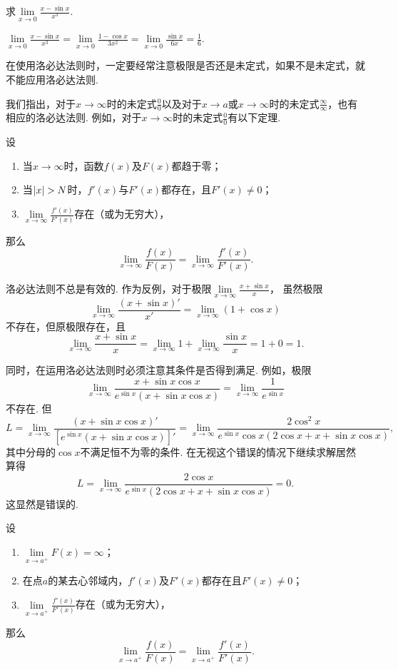 \begin{example}
\def\l{\lim\limits_{x\to0}}
\def\a{\l\frac{x-\sin x}{x^3}}
求\(\a\).
\begin{solution}
\(\a = \l\frac{1-\cos x}{3x^2} = \l\frac{\sin x}{6x} = \frac{1}{6}\).
\end{solution}
\end{example}

在使用洛必达法则时，一定要经常注意极限是否还是未定式，如果不是未定式，就不能应用洛必达法则.

我们指出，对于\(x\to\infty\)时的未定式\(\frac{0}{0}\)以及对于\(x \to a\)或\(x\to\infty\)时的未定式\(\frac{\infty}{\infty}\)，也有相应的洛必达法则.
例如，对于\(x\to\infty\)时的未定式\(\frac{0}{0}\)有以下定理.
\begin{theorem}\label{theorem:微分中值定理.洛必达法则2}
\def\l{\lim\limits_{x\to\infty}}
设\begin{enumerate}
	\item 当\(x\to\infty\)时，函数\(f(x)\)及\(F(x)\)都趋于零；
	\item 当\(\abs{x}>N\)时，\(f'(x)\)与\(F'(x)\)都存在，且\(F'(x) \neq 0\)；
	\item \(\l\frac{f'(x)}{F'(x)}\)存在（或为无穷大），%
\end{enumerate}那么\[
	\l\frac{f(x)}{F(x)} = \l\frac{f'(x)}{F'(x)}.
\]
\end{theorem}

\begin{example}
\def\l{\lim\limits_{x\to\infty}}%
\def\a{\l\frac{x+\sin x}{x}}%
洛必达法则不总是有效的.
作为反例，对于极限\(\a\)，%
虽然极限\[
\l\frac{(x+\sin x)'}{x'} = \l(1+\cos x)
\]不存在，但原极限存在，且
\[
\a = \l1+\l\frac{\sin x}{x} = 1 + 0 = 1.
\]

\def\l{\lim\limits_{x\to\infty}}%
\def\a{\l\frac{x+\sin x \cos x}{e^{\sin x}(x+\sin x \cos x)}}%
同时，在运用洛必达法则时必须注意其条件是否得到满足.
例如，极限\[
\a = \l\frac{1}{e^{\sin x}}
\]不存在.
但\[
L = \l\frac{(x+\sin x \cos x)'}{[e^{\sin x}(x+\sin x \cos x)]'} = \l\frac{2\cos^2 x}{e^{\sin x}\cos x(2\cos x + x + \sin x \cos x)},
\]其中分母的\(\cos x\)不满足恒不为零的条件.
在无视这个错误的情况下继续求解居然算得
\[
L = \l\frac{2\cos x}{e^{\sin x}(2\cos x + x + \sin x \cos x)} = 0.
\]
这显然是错误的.
\end{example}

\begin{theorem}\label{theorem:微分中值定理.洛必达法则3}
\def\l{\lim\limits_{x \to a^+}}
设\begin{enumerate}
\item \(\l F(x) = \infty\)；
\item 在点\(a\)的某去心邻域内，\(f'(x)\)及\(F'(x)\)都存在且\(F'(x) \neq 0\)；
\item \(\l\frac{f'(x)}{F'(x)}\)存在（或为无穷大），%
\end{enumerate}那么\[
\l\frac{f(x)}{F(x)} = \l\frac{f'(x)}{F'(x)}.
\]
\end{theorem}


